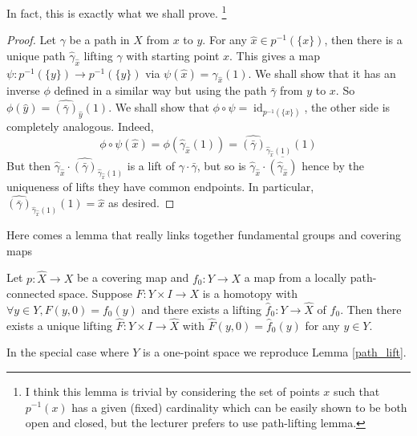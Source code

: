 In fact, this is exactly what we shall prove.
\footnote{I think this lemma is trivial by considering the set of points $x$ such that $p^{-1}(x)$ has a given (fixed) cardinality which can be easily shown to be both open and closed, but the lecturer prefers to use path-lifting lemma.}
\begin{proof}
    Let $\gamma$ be a path in $X$ from $x$ to $y$.
    For any $\hat{x}\in p^{-1}(\{x\})$, then there is a unique path $\hat{\gamma}_{\hat{x}}$ lifting $\gamma$ with starting point $\hat{x}$.
    This gives a map $\psi:p^{-1}(\{y\})\to p^{-1}(\{y\})$ via $\psi(\hat{x})=\hat{\gamma}_{\hat{x}}(1)$.
    We shall show that it has an inverse $\phi$ defined in a similar way but using the path $\bar\gamma$ from $y$ to $x$.
    So $\phi(\hat{y})=\widehat{(\bar\gamma)}_{\hat{y}}(1)$.
    We shall show that $\phi\circ\psi=\operatorname{id}_{p^{-1}(\{x\})}$, the other side is completely analogous.
    Indeed,
    $$\phi\circ\psi(\hat{x})=\phi(\hat{\gamma}_{\hat{x}}(1))=\widehat{(\bar\gamma)}_{\hat{\gamma}_{\hat{x}}(1)}(1)$$
    But then $\hat{\gamma}_{\hat{x}}\cdot\widehat{(\bar\gamma)}_{\hat{\gamma}_{\hat{x}}(1)}$ is a lift of $\gamma\cdot\bar\gamma$, but so is $\hat{\gamma}_{\hat{x}}\cdot\overline{(\hat{\gamma}_{\hat{x}})}$ hence by the uniqueness of lifts they have common endpoints.
    In particular, $\widehat{(\bar\gamma)}_{\hat{\gamma}_{\hat{x}}(1)}(1)=\hat{x}$ as desired.
\end{proof}
Here comes a lemma that really links together fundamental groups and covering maps
\begin{lemma}\label{homotopy_lifting}
    Let $p:\hat{X}\to X$ be a covering map and $f_0:Y\to X$ a map from a locally path-connected space.
    Suppose $F:Y\times I\to X$ is a homotopy with $\forall y\in Y,F(y,0)=f_0(y)$ and there exists a lifting $\hat{f}_0:Y\to\hat{X}$ of $f_0$.
    Then there exists a unique lifting $\hat{F}:Y\times I\to\hat{X}$ with $\hat{F}(y,0)=\hat{f}_0(y)$ for any $y\in Y$.
\end{lemma}
\begin{remark}
    In the special case where $Y$ is a one-point space we reproduce Lemma \ref{path_lift}.
\end{remark}
